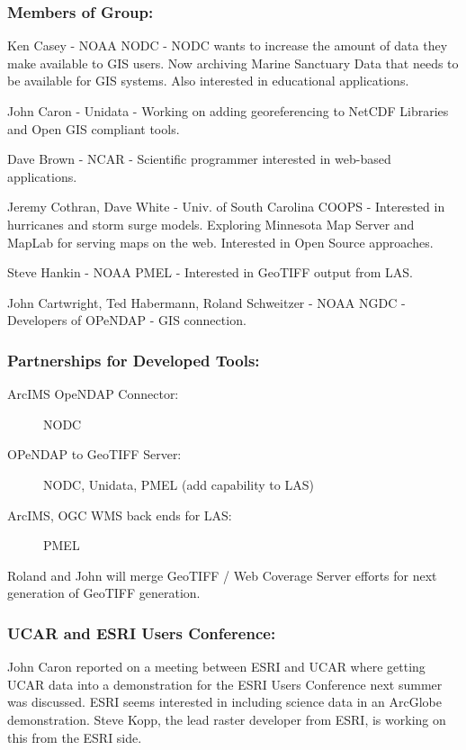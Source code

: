 \subsubsection{Members of Group:}

Ken Casey - NOAA NODC - NODC wants to increase the amount of data they
make available to GIS users. Now archiving Marine Sanctuary Data that
needs to be available for GIS systems. Also interested in educational
applications.
 
John Caron - Unidata - Working on adding georeferencing to NetCDF
Libraries and Open GIS compliant tools.
 
Dave Brown - NCAR - Scientific programmer interested in web-based
applications.
 
Jeremy Cothran, Dave White - Univ. of South Carolina COOPS - Interested
in hurricanes and storm surge models. Exploring Minnesota Map Server and
MapLab for serving maps on the web. Interested in Open Source
approaches.
 
Steve Hankin - NOAA PMEL - Interested in GeoTIFF output from LAS.
 
John Cartwright, Ted Habermann, Roland Schweitzer - NOAA NGDC -
Developers of OPeNDAP - GIS connection.
 
\subsubsection{Partnerships for Developed Tools:}

\begin{description}
\item[ArcIMS OpeNDAP Connector:] NODC

\item[OPeNDAP to GeoTIFF Server:] NODC, Unidata, PMEL (add capability to LAS)

\item[ArcIMS, OGC WMS back ends for LAS:] PMEL
\end{description}

Roland and John will merge GeoTIFF / Web Coverage Server efforts for
next generation of GeoTIFF generation.
 
\subsubsection{UCAR and ESRI Users Conference:}

John Caron reported on a meeting between ESRI and UCAR where getting
UCAR data into a demonstration for the ESRI Users Conference next summer
was discussed. ESRI seems interested in including science data in an
ArcGlobe demonstration. Steve Kopp, the lead raster developer from ESRI,
is working on this from the ESRI side.
 
